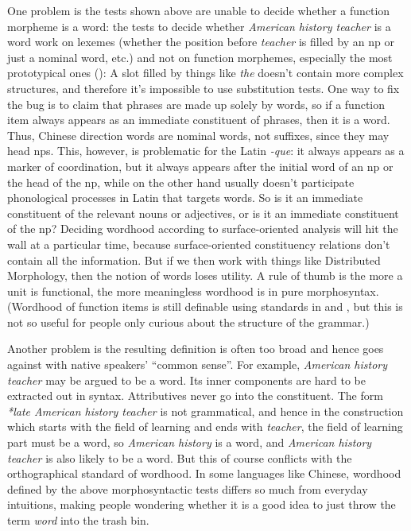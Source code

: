 \documentclass[UTF8, a4paper, oneside, scheme=plain]{ctexart}
\newcommand*{\term}[1]{\emph{#1}}
\newcommand*{\corpus}[1]{\emph{#1}}
\begin{document}
One problem is the tests shown above are unable to decide whether a function morpheme is a word:
the tests to decide whether \corpus{American history teacher} is a word work on lexemes 
(whether the position before \corpus{teacher} is filled by an \ac{np} or just a nominal word, etc.)
and not on function morphemes, especially the most prototypical ones
():
A slot filled by things like \corpus{the} doesn't contain more complex structures,
and therefore it's impossible to use substitution tests.
One way to fix the bug is to 
claim that phrases are made up solely by words,
so if a function item always appears as an immediate constituent of phrases,
then it is a word.
Thus, Chinese direction words are nominal words, not suffixes,
since they may head \ac{np}s.
This, however, is problematic for the Latin \corpus{-que}:
it always appears as a marker of coordination,
but it always appears after the initial word of an \ac{np} or the head of the \ac{np},
while on the other hand usually doesn't participate phonological processes in Latin that targets words.
So is it an immediate constituent of the relevant nouns or adjectives,
or is it an immediate constituent of the \ac{np}?
Deciding wordhood according to surface-oriented analysis will hit the wall at a particular time,
because surface-oriented constituency relations don't contain all the information.
But if we then work with things like Distributed Morphology,
then the notion of words loses utility.
A rule of thumb is the more a unit is functional,
the more meaningless wordhood is in pure morphosyntax.
(Wordhood of function items is still definable using standards 
in  and ,
but this is not so useful for people only curious about the structure of the grammar.)

Another problem is the resulting definition is often too broad and hence
goes against with native speakers' ``common sense''.
For example, \corpus{American history teacher} may be argued to be a word.
Its inner components are hard to be extracted out in syntax.
Attributives never go into the constituent.
The form \corpus{*late American history teacher} is not grammatical,
and hence in the construction which starts with the field of learning and ends with \corpus{teacher},
the field of learning part must be a word,
so \corpus{American history} is a word,
and \corpus{American history teacher} is also likely to be a word.
But this of course conflicts with the orthographical standard of wordhood.
In some languages like Chinese, 
wordhood defined by the above morphosyntactic tests 
differs so much from everyday intuitions,
making people wondering whether it is a good idea to just throw the term \term{word} into the trash bin.
\end{document}
